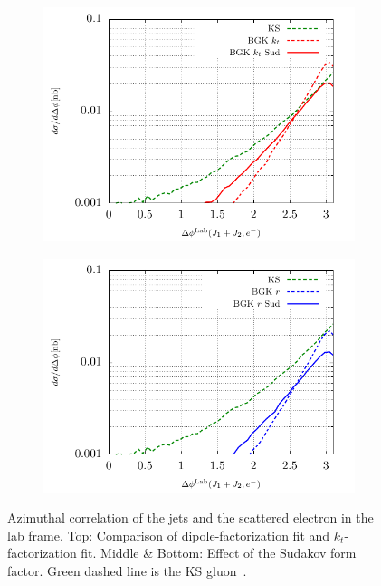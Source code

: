 \documentclass[12pt]{article}
\numberwithin{equation}{section}
\numberwithin{table}{section}
\numberwithin{figure}{section}
\begin{document}
\begin{figure}[p]
	\begin{subfigure}{0.5\textwidth}
		\includegraphics[width=\textwidth]{plots/plotBGK2Lab}
	\end{subfigure}
	\begin{subfigure}{0.5\textwidth}
		\includegraphics[width=\textwidth]{plots/plotBGK3Lab}
	\end{subfigure}
\caption{\footnotesize Azimuthal correlation of the jets and the scattered electron in the lab frame. Top: Comparison of dipole-factorization fit and $k_t$-factorization fit. Middle \& Bottom: Effect of the Sudakov form factor.  Green dashed line is the KS gluon~\cite{vanHameren:2021sqc}.}
\label{fig:je-lab}
\end{figure}
\end{document}

